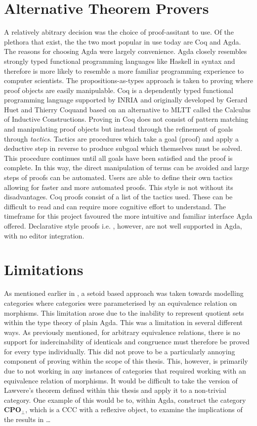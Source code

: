 
\section{Alternative Theorem Provers}
\label{sec:altthmprov}
A relatively abitrary decision was the choice of proof-assitant to use. Of the
plethora that exist, the the two most popular in use today are Coq
and Agda. The reasons for choosing Agda were largely convenience. Agda
closely resembles strongly typed functional programming languages like Haskell
in syntax and therefore is more likely to resemble a more familiar programming
experience to computer scientists. The propositions-as-types approach is taken
to proving where proof objects are easily manipulable. Coq is a dependently
typed functional programming language supported by INRIA and originally
developed by Gerard Huet and Thierry Coquand based on an alternative to MLTT
called the Calculus of Inductive Constructions. Proving in Coq does not consist
of pattern matching and manipulating proof objects but instead through the
refinement of goals through \textit{tactics}. Tactics are procedures which take
a goal (proof) and apply a deductive step in reverse to produce subgoal which
themselves must be solved. This procedure continues until all goals have been
satisfied and the proof is complete. In this way, the direct manipulation of
terms can be avoided and large steps of proofs can be automated. Users are able
to define their own tactics allowing for faster and more automated proofs. This
style is not without its disadvantages. Coq proofs consist of a list of
the tactics used. These can be difficult to read and can require more cognitive
effort to understand. The timeframe for this project favoured the more intuitive
and familiar interface Agda offered. Declarative style proofs i.e.
, however, are not well supported in Agda, with no editor
integration.

\section{Limitations}
As mentioned earlier in , a setoid based approach was taken towards
modelling categories where categories were parameterised by an equivalence
relation on morphisms. This limitation arose due to the inability to represent
quotient sets within the type theory of plain Agda. This was a limitation in
several different ways. As previously mentioned, for arbitrary equivalence
relations, there is no support for indercinability of identicals and congruence
must therefore be proved for every type individually. This did not prove to be a
particularly annoying component of proving within the scope of this thesis.
This, however, is primarily due to not working in any instances of categories
that required working with an equivalence relation of morphisms. It would be
difficult to take the version of Lawvere's theorem defined within this thesis
and apply it to a non-trivial category. One example of this would be to, within
Agda, construct the category $\bm{CPO}_{\bot}$, which is a CCC with a reflexive
object, to examine the implications of the results in \ldots{}


